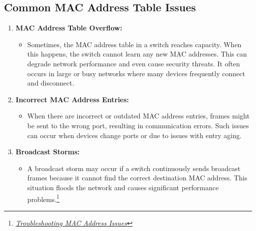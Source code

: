 \documentclass[11pt,a4paper]{article}
\begin{document}
\subsection*{Common MAC Address Table Issues}
\begin{enumerate}
    \item \textbf{MAC Address Table Overflow:}
        \begin{itemize}
            \item Sometimes, the MAC address table in a switch reaches capacity. When this happens, the switch cannot learn any new MAC addresses. This can degrade network performance and even cause security threats. It often occurs in large or busy networks where many devices frequently connect and disconnect.
        \end{itemize}

    \item \textbf{Incorrect MAC Address Entries:}
        \begin{itemize}
            \item When there are incorrect or outdated MAC address entries, frames might be sent to the wrong port, resulting in communication errors. Such issues can occur when devices change ports or due to issues with entry aging.
        \end{itemize}

    \item \textbf{Broadcast Storms:}
        \begin{itemize}
            \item A broadcast storm may occur if a switch continuously sends broadcast frames because it cannot find the correct destination MAC address. This situation floods the network and causes significant performance problems.\footnote{\href{https://netseccloud.com/troubleshooting-common-issues-with-cisco-mac-address-tables}{\textit{Troubleshooting MAC Address Issues}}}
        \end{itemize}

\end{enumerate}
\end{document}

